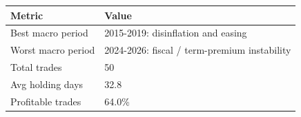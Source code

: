 \begin{tabular}{ll}
\toprule
Metric & Value \\
\midrule
Best macro period & 2015-2019: disinflation and easing \\
Worst macro period & 2024-2026: fiscal / term-premium instability \\
Total trades & 50 \\
Avg holding days & 32.8 \\
Profitable trades & 64.0\% \\
\bottomrule
\end{tabular}
